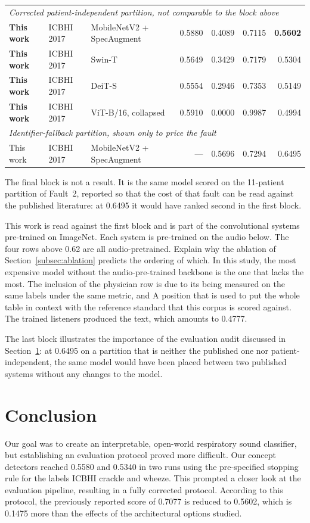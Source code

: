 \documentclass[journal,onecolumn]{IEEEtran}
\newcommand{\best}[1]{\textbf{#1}}
\begin{document}
\begin{table}[hbtp]
\begin{tabular}{lllrrrr}
\multicolumn{7}{l}{\emph{Corrected patient-independent partition, not comparable to the block above}}\\
\best{This work} & ICBHI 2017 & MobileNetV2 + SpecAugment & 0.5880 & 0.4089 & 0.7115 & \best{0.5602} \\
\best{This work} & ICBHI 2017 & Swin-T & 0.5649 & 0.3429 & 0.7179 & 0.5304 \\
\best{This work} & ICBHI 2017 & DeiT-S & 0.5554 & 0.2946 & 0.7353 & 0.5149 \\
\best{This work} & ICBHI 2017 & ViT-B/16, collapsed & 0.5910 & 0.0000 & 0.9987 & 0.4994 \\
\midrule
\multicolumn{7}{l}{\emph{Identifier-fallback partition, shown only to price the fault}}\\
This work & ICBHI 2017 & MobileNetV2 + SpecAugment & --- & 0.5696 & 0.7294 & 0.6495 \\
\bottomrule
\end{tabular}

\vspace{2pt}
\footnotesize The final block is not a result. It is the same model scored on the 11-patient
partition of Fault~2, reported so that the cost of that fault can be read against the published
literature: at 0.6495 it would have ranked second in the first block.
\end{table}

This work is read against the first block and is part of the convolutional systems pre-trained on ImageNet.
Each system is pre-trained on the audio below. The four rows above 0.62 are all audio-pretrained.
Explain why the ablation of Section~\ref{subsec:ablation} predicts the ordering of which.
In this study, the most expensive model without the audio-pre-trained backbone is the one that lacks the most. 
The inclusion of the physician row is due to its being measured on the same labels under the same metric, and
A position that is used to put the whole table in context with the reference standard that this corpus is scored against.
The trained listeners produced the text, which amounts to 0.4777.

The last block illustrates the importance of the evaluation audit discussed in
Section~\ref{sec:conclusion}: at 0.6495 on a partition that is neither the published one
nor patient-independent, the same model would have been placed between two published
systems without any changes to the model.

\section{Conclusion}
\label{sec:conclusion}Our goal was to create an interpretable, open-world respiratory sound classifier, but establishing an evaluation protocol proved more difficult. Our concept detectors reached 0.5580 and 0.5340 in two runs using the pre-specified stopping rule for the labels ICBHI crackle and wheeze. This prompted a closer look at the evaluation pipeline, resulting in a fully corrected protocol. According to this protocol, the previously reported score of 0.7077 is reduced to 0.5602, which is 0.1475 more than the effects of the architectural options studied.
\end{document}
